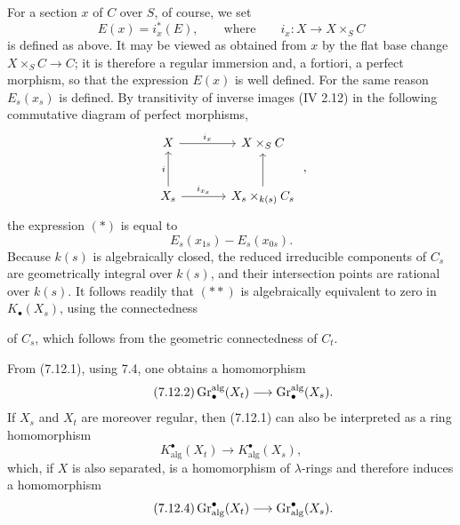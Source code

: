For a section $x$ of $C$ over $S$, of course, we set
\[
E(x)=i_x^*(E),
\qquad\text{where}\qquad
i_x:X\longrightarrow X\times_SC
\]
is defined as above. It may be viewed as obtained from $x$ by the flat base
change $X\times_SC\to C$; it is therefore a regular immersion and, a
fortiori, a perfect morphism, so that the expression $E(x)$ is well defined.
For the same reason $E_s(x_s)$ is defined. By transitivity of inverse images
(IV 2.12) in the following commutative diagram of perfect morphisms,
\[
\begin{tikzcd}[column sep=large,row sep=large]
X \arrow[r,"i_x"] & X\times_SC\\
X_s \arrow[u,"i"] \arrow[r,"i_{x_s}"] &
X_s\times_{k(s)}C_s \arrow[u]
\end{tikzcd}
\;,
\]
the expression $(*)$ is equal to
\[
E_s(x_{1s})-E_s(x_{0s}).
\tag{**}
\]
Because $k(s)$ is algebraically closed, the reduced irreducible components
of $C_s$ are geometrically integral over $k(s)$, and their intersection
points are rational over $k(s)$. It follows readily that $(**)$ is
algebraically equivalent to zero in $K_\bullet(X_s)$, using the connectedness

of $C_s$, which follows from the geometric connectedness of $C_t$.

From (7.12.1), using 7.4, one obtains a homomorphism
\begin{equation}\tag{7.12.2}
\operatorname{Gr}_\bullet^{\mathrm{alg}}(X_t)
\longrightarrow \operatorname{Gr}_\bullet^{\mathrm{alg}}(X_s).
\end{equation}
If $X_s$ and $X_t$ are moreover regular, then (7.12.1) can also be
interpreted as a ring homomorphism
\begin{equation}\tag{7.12.3}
K^\bullet_{\mathrm{alg}}(X_t)
\longrightarrow K^\bullet_{\mathrm{alg}}(X_s),
\end{equation}
which, if $X$ is also separated, is a homomorphism of $\lambda$-rings and
therefore induces a homomorphism
\begin{equation}\tag{7.12.4}
\operatorname{Gr}^\bullet_{\mathrm{alg}}(X_t)
\longrightarrow \operatorname{Gr}^\bullet_{\mathrm{alg}}(X_s).
\end{equation}

